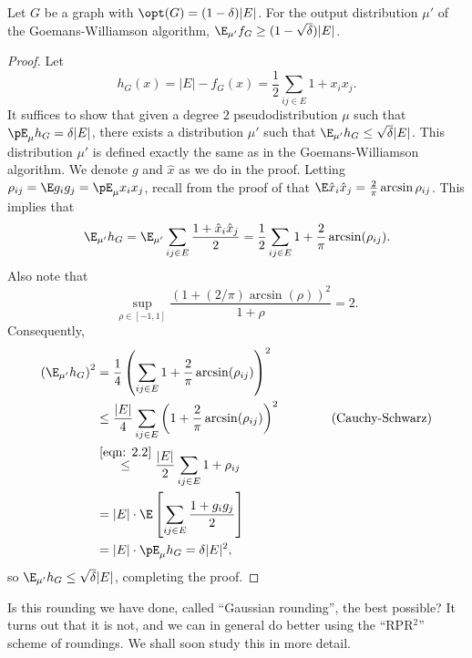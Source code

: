 	\begin{fprop}
		\label{prop: gw-reparametr}
		Let $G$ be a graph with $\opt(G) = (1-\delta)|E|$. For the output distribution $\mu'$ of the Goemans-Williamson algorithm, $\E_{\mu'} f_G \ge (1 - \sqrt{\delta}) |E|$.
	\end{fprop}
	\begin{proof}
		Let
		\[ h_G(x) = |E| - f_G(x) = \frac{1}{2} \sum_{ij \in E} 1+x_ix_j. \]
		It suffices to show that given a degree $2$ pseudodistribution $\mu$ such that $\pE_\mu h_G = \delta |E|$, there exists a distribution $\mu'$ such that $\E_{\mu'} h_G \le \sqrt{\delta} |E|$. This distribution $\mu'$ is defined exactly the same as in the Goemans-Williamson algorithm.  We denote $g$ and $\hat{x}$ as we do in the proof.
		Letting $\rho_{ij} = \E g_i g_j = \pE_\mu x_i x_j$, recall from the proof of  that $\E \hat{x}_i \hat{x}_j = \frac{2}{\pi} \arcsin \rho_{ij}$. This implies that
		\[ \E_{\mu'} h_G = \E_{\mu'} \sum_{ij \in E} \frac{1+\hat{x}_i \hat{x}_j}{2} = \frac{1}{2} \sum_{ij \in E} 1 + \frac{2}{\pi} \arcsin(\rho_{ij}). \]
		Also note that
		\begin{equation}
			\label{eqn: 2.2}
			\sup_{\rho \in [-1,1]} \frac{\left(1+(2/\pi)\arcsin(\rho)\right)^2}{1+\rho} = 2.
		\end{equation}
		Consequently,
		\begin{align*}
			\left(\E_{\mu'} h_G\right)^2 &= \frac{1}{4} \left(\sum_{ij \in E} 1+\frac{2}{\pi} \arcsin(\rho_{ij})\right)^2 \\
				&\le \frac{|E|}{4} \sum_{ij \in E} \left( 1 + \frac{2}{\pi} \arcsin(\rho_{ij}) \right)^2 \qquad\qquad \text{(Cauchy-Schwarz)} \\
				&\stackrel{\eqref{eqn: 2.2}}{\le} \frac{|E|}{2} \sum_{ij \in E} 1+\rho_{ij} \\
				&= |E| \cdot \E\left[\sum_{ij \in E} \frac{1+g_ig_j}{2}\right] \\
				&= |E| \cdot \pE_\mu h_G = \delta |E|^2,
		\end{align*}
		so $\E_{\mu'} h_G \le \sqrt{\delta} |E|$, completing the proof.
	\end{proof}

	Is this rounding we have done, called ``Gaussian rounding'', the best possible? It turns out that it is not, and we can in general do better using the ``RPR$^2$'' scheme of roundings. We shall soon study this in more detail.\\

